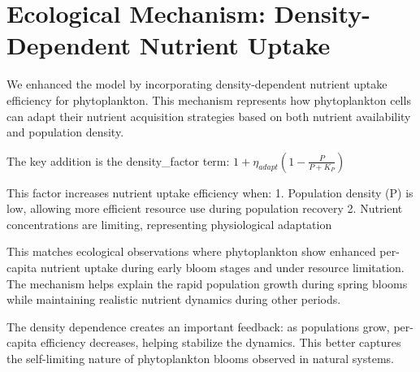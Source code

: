 \section{Ecological Mechanism: Density-Dependent Nutrient Uptake}

We enhanced the model by incorporating density-dependent nutrient uptake efficiency for phytoplankton. This mechanism represents how phytoplankton cells can adapt their nutrient acquisition strategies based on both nutrient availability and population density.

The key addition is the density_factor term:
$1 + \eta_{adapt} (1 - \frac{P}{P + K_P})$

This factor increases nutrient uptake efficiency when:
1. Population density (P) is low, allowing more efficient resource use during population recovery
2. Nutrient concentrations are limiting, representing physiological adaptation

This matches ecological observations where phytoplankton show enhanced per-capita nutrient uptake during early bloom stages and under resource limitation. The mechanism helps explain the rapid population growth during spring blooms while maintaining realistic nutrient dynamics during other periods.

The density dependence creates an important feedback: as populations grow, per-capita efficiency decreases, helping stabilize the dynamics. This better captures the self-limiting nature of phytoplankton blooms observed in natural systems.
